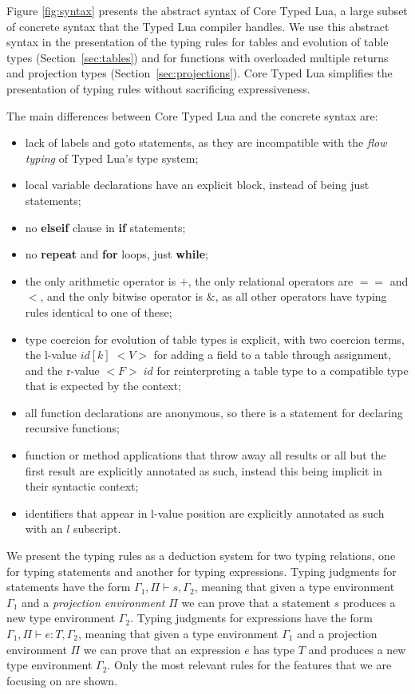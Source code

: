 \documentclass[preprint]{sigplanconf}
\newcommand{\env}{\Gamma}
\newcommand{\penv}{\Pi}
\begin{document}
Figure \ref{fig:syntax} presents the abstract syntax of 
Core Typed Lua, a large subset of concrete syntax
that the Typed Lua compiler handles. We use this abstract
syntax in the presentation of the typing rules
for tables and evolution of table types (Section~\ref{sec:tables})
and for functions with overloaded multiple returns and
projection types (Section~\ref{sec:projections}).
Core Typed Lua simplifies the presentation of typing rules
without sacrificing expressiveness.

The main differences between Core Typed Lua and the concrete
syntax are:
\begin{itemize}
\item lack of labels and goto statements, as they are incompatible
with the {\em flow typing} of Typed Lua's type system;
\item local variable declarations have an explicit block,
instead of being just statements;
\item no {\bf elseif} clause in {\bf if} statements;
\item no {\bf repeat} and {\bf for} loops, just {\bf while};
\item the only arithmetic operator is $+$, the only relational
operators are $==$ and $<$, and the only bitwise operator
is $\&$, as all other operators have typing rules identical to
one of these;
\item type coercion for evolution of table types is explicit,
with two coercion terms, the l-value $id[k] \; {<}V{>}$ for adding a field to 
a table through assignment, and the r-value ${<}F{>} \;id$ for reinterpreting
a table type to a compatible type that is expected by the context;
\item all function declarations are anonymous, so there is a
statement for declaring recursive functions;
\item function or method applications that throw away all
results or all but the first result are explicitly annotated
as such, instead this being implicit in their syntactic context;
\item identifiers that appear in l-value position are explicitly
annotated as such with an $l$ subscript.
\end{itemize}

We present the typing rules as a deduction system for two typing relations, one for typing statements and another for typing expressions. Typing judgments for statements have the form $\env_{1}, \penv \vdash s, \env_{2}$, meaning that
given a type environment $\env_{1}$ and a {\em projection environment} $\penv$ we can prove that a statement $s$ produces a new type environment $\env_{2}$. Typing judgments for
expressions have the form $\env_{1}, \penv \vdash e : T, \env_{2}$, meaning that given a type environment $\env_{1}$
and a projection environment $\penv$ we can prove that an expression $e$ has type $T$ and produces a new type environment $\env_{2}$.
Only the most relevant rules for the features that we are focusing on are shown.
\end{document}
